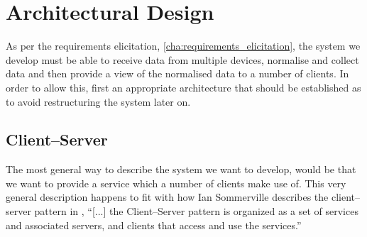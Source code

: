 





\chapter{Architectural Design}\label{cha:architectural_design}
As per the requirements elicitation, \cref{cha:requirements_elicitation}, the system we develop must be able to receive data from multiple devices, normalise and collect data and then provide a view of the normalised data to a number of clients.
In order to allow this, first an appropriate architecture that should be established as to avoid restructuring the system later on.

\section{Client--Server}
The most general way to describe the system we want to develop, would be that we want to provide a service which a number of clients make use of.
This very general description happens to fit with how Ian Sommerville describes the client--server pattern in \cite{software_engineering},
``[...] the Client--Server pattern is organized as a set of services and associated servers, and clients that access and use the services.''

